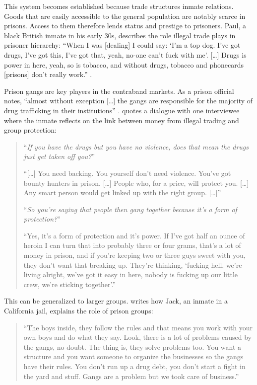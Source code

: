 \documentclass[a4paper, 12pt]{article}
\begin{document}
This system becomes established because trade structures inmate relations. Goods that are easily accessible to the general population are notably scarce in prisons. Access to them therefore lends status and prestige to prisoners. Paul, a black British inmate in his early 30s, describes the role illegal trade plays in prisoner hierarchy: ``When I was [dealing] I could say: `I'm a top dog. I've got drugs, I've got this, I've got that, yeah, no-one can't fuck with me'. [\dots] Drugs is power in here, yeah, so is tobacco, and without drugs, tobacco and phonecards [prisons] don't really work.'' \citep[p. 360--361]{crewe2006prison}. 

Prison gangs are key players in the contraband markets. As a prison official notes, ``almost without exception [\dots] the gangs are responsible for the majority of drug trafficking in their institutions'' \citep[p. 52]{camp1985prison}. \citet[p. 361--362]{crewe2006prison} quotes a dialogue with one interviewee where the inmate reflects on the link between money from illegal trading and group protection:

\begin{quote}
``\textit{If you have the drugs but you have no violence, does that mean the drugs just get taken off you?}''

``[\dots] You need backing. You yourself don't need violence. You've got bounty hunters in prison. [\dots] People who, for a price, will protect you. [\dots] Any smart person would get linked up with the right group. [\dots]''

``\textit{So you're saying that people then gang together because it's a form of protection?}''

``Yes, it's a form of protection and it's power. If I've got half an ounce of heroin I can turn that into probably three or four grams, that's a lot of money in prison, and if you're keeping two or three guys sweet with you, they don't want that breaking up. They're thinking, `fucking hell, we're living alright, we've got it easy in here, nobody is fucking up our little crew, we're sticking together'.''
\end{quote}

This can be generalized to larger groups. \citet[p. 755]{trammell2009values} writes how Jack, an inmate in a California jail, explains the role of prison groups:

\begin{quote}
``The boys inside, they follow the rules and that means you work with your own boys and do what they say. Look, there is a lot of problems caused by the gangs, no doubt. The thing is, they solve problems too. You want a structure and you want someone to organize the businesses so the gangs have their rules. You don't run up a drug debt, you don't start a fight in the yard and stuff. Gangs are a problem but we took care of business.''
\end{quote}
\end{document}
